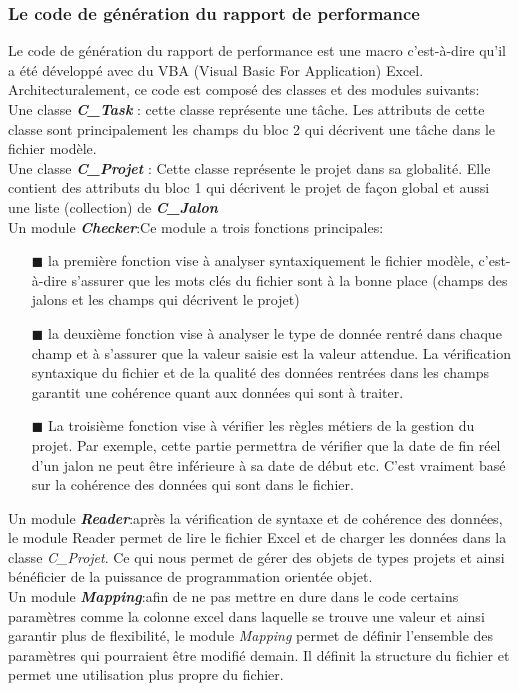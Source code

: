 \subsubsection*{Le code de génération du rapport de performance}
Le code de génération du rapport de performance est une macro c'est-à-dire qu'il a été développé avec du VBA (Visual Basic For Application) Excel. Architecturalement, ce code est composé des classes et des modules suivants:\\
Une classe \textbf{\textit{C\_Task }}: cette classe représente une tâche. Les attributs de cette classe sont principalement les champs du bloc 2 qui décrivent une tâche dans le fichier modèle.\\
Une classe \textbf{\textit{C\_Projet }}: Cette classe représente le projet dans sa globalité. Elle contient des attributs du bloc 1 qui décrivent le projet de façon global et aussi une liste (collection) de \textbf{\textit{C\_Jalon}}\\
Un module \textbf{\textit{Checker}}:Ce module a trois fonctions principales: 
\begin{itemize}
\item[\tiny{$\blacksquare$}]la première fonction vise à analyser syntaxiquement le fichier modèle, c'est-à-dire s'assurer que les mots clés du fichier sont à la bonne place (champs des jalons et les champs qui décrivent le projet)
\item[\tiny{$\blacksquare$}]la deuxième fonction vise à analyser le type de donnée rentré dans chaque champ et à s'assurer que la valeur saisie est la valeur attendue. La vérification syntaxique du fichier et de la qualité des données rentrées dans les champs garantit une cohérence quant aux données qui sont à traiter.
\item[\tiny{$\blacksquare$}]La troisième fonction vise à vérifier les règles métiers de la gestion du projet. Par exemple, cette partie permettra de vérifier que la date de fin réel d'un jalon ne peut être inférieure à sa date de début etc. C'est vraiment basé sur la cohérence des données qui sont dans le fichier.
\end{itemize}
Un module \textbf{\textit{Reader}}:après la vérification de syntaxe et de cohérence des données, le module Reader permet de lire le fichier Excel et de charger les données dans la classe \textit{C\_Projet}. Ce qui nous permet de gérer des objets de types projets et ainsi bénéficier de la puissance de programmation orientée objet.\\
Un module \textbf{\textit{Mapping}}:afin de ne pas mettre en dure dans le code certains paramètres comme la colonne excel dans laquelle se trouve une valeur et ainsi garantir plus de flexibilité, le module \textit{Mapping} permet de définir l'ensemble des paramètres qui pourraient être modifié demain. Il définit la structure du fichier et permet une utilisation plus propre du fichier.\\
